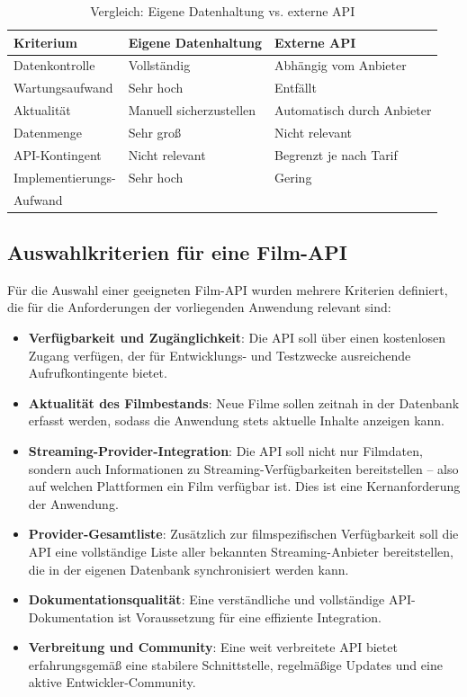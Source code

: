 \begin{table}[h]
\centering
\begin{tabular}{|p{3.5cm}|p{4.5cm}|p{4.5cm}|}
\hline
\textbf{Kriterium} & \textbf{Eigene Datenhaltung} & \textbf{Externe API} \\
\hline
Datenkontrolle & Vollständig & Abhängig vom Anbieter \\
Wartungsaufwand & Sehr hoch & Entfällt \\
Aktualität & Manuell sicherzustellen & Automatisch durch Anbieter \\
Datenmenge & Sehr groß & Nicht relevant \\
API-Kontingent & Nicht relevant & Begrenzt je nach Tarif \\
Implementierungs- & Sehr hoch & Gering \\
Aufwand & & \\
\hline
\end{tabular}
\caption{Vergleich: Eigene Datenhaltung vs. externe API}
\label{tab:api_vergleich}
\end{table}


\subsection{Auswahlkriterien für eine Film-API}

Für die Auswahl einer geeigneten Film-API wurden mehrere Kriterien definiert,
die für die Anforderungen der vorliegenden Anwendung relevant sind:

\begin{itemize}
    \item \textbf{Verfügbarkeit und Zugänglichkeit}: Die API soll über einen
    kostenlosen Zugang verfügen, der für Entwicklungs- und Testzwecke
    ausreichende Aufrufkontingente bietet.
    \item \textbf{Aktualität des Filmbestands}: Neue Filme sollen zeitnah
    in der Datenbank erfasst werden, sodass die Anwendung stets aktuelle
    Inhalte anzeigen kann.
    \item \textbf{Streaming-Provider-Integration}: Die API soll nicht nur
    Filmdaten, sondern auch Informationen zu Streaming-Verfügbarkeiten
    bereitstellen -- also auf welchen Plattformen ein Film verfügbar ist.
    Dies ist eine Kernanforderung der Anwendung.
    \item \textbf{Provider-Gesamtliste}: Zusätzlich zur filmspezifischen
    Verfügbarkeit soll die API eine vollständige Liste aller bekannten
    Streaming-Anbieter bereitstellen, die in der eigenen Datenbank
    synchronisiert werden kann.
    \item \textbf{Dokumentationsqualität}: Eine verständliche und vollständige
    API-Dokumentation ist Voraussetzung für eine effiziente Integration.
    \item \textbf{Verbreitung und Community}: Eine weit verbreitete API
    bietet erfahrungsgemäß eine stabilere Schnittstelle, regelmäßige
    Updates und eine aktive Entwickler-Community.
\end{itemize}

